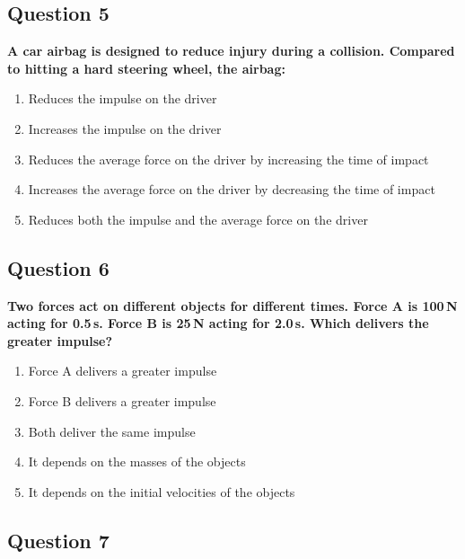 \documentclass[12pt,letterpaper]{article}
\begin{document}
\subsection{Question 5}

\begin{questionbox}
\textbf{A car airbag is designed to reduce injury during a collision. Compared to hitting a hard steering wheel, the airbag:}

\begin{enumerate}[label=\alph*)]
    \item Reduces the impulse on the driver
    \item Increases the impulse on the driver
    \item Reduces the average force on the driver by increasing the time of impact
    \item Increases the average force on the driver by decreasing the time of impact
    \item Reduces both the impulse and the average force on the driver
\end{enumerate}
\end{questionbox}

\subsection{Question 6}

\begin{questionbox}
\textbf{Two forces act on different objects for different times. Force A is 100\,N acting for 0.5\,s. Force B is 25\,N acting for 2.0\,s. Which delivers the greater impulse?}

\begin{enumerate}[label=\alph*)]
    \item Force A delivers a greater impulse
    \item Force B delivers a greater impulse
    \item Both deliver the same impulse
    \item It depends on the masses of the objects
    \item It depends on the initial velocities of the objects
\end{enumerate}
\end{questionbox}

\subsection{Question 7}
\end{document}
